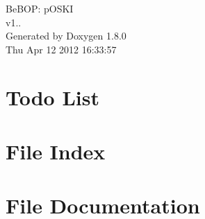 \documentclass{book}
\begin{document}
\hypersetup{pageanchor=false,citecolor=blue}
\begin{titlepage}
\vspace*{7cm}
\begin{center}
{\Large Be\-B\-O\-P\-: p\-O\-S\-K\-I \\[1ex]\large v1.. }\\
\vspace*{1cm}
{\large Generated by Doxygen 1.8.0}\\
\vspace*{0.5cm}
{\small Thu Apr 12 2012 16:33:57}\\
\end{center}
\end{titlepage}
\clearemptydoublepage
{}
\tableofcontents
\clearemptydoublepage
{}
\hypersetup{pageanchor=true,citecolor=blue}
\chapter{Todo List}
\label{todo}
\hypertarget{todo}{}

\chapter{File Index}

\chapter{File Documentation}






























\printindex
\end{document}
